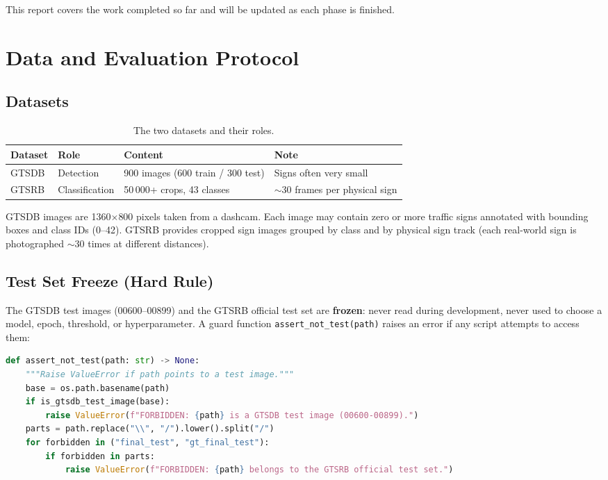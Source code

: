 \documentclass[12pt,a4paper]{article}
\begin{document}
This report covers the work completed so far and will be updated as each phase is finished.

\section{Data and Evaluation Protocol}
\label{sec:data}

\subsection{Datasets}

\begin{table}[H]
\centering
\renewcommand{\arraystretch}{1.3}
\begin{tabular}{llll}
\toprule
\textbf{Dataset} & \textbf{Role} & \textbf{Content} & \textbf{Note} \\
\midrule
GTSDB & Detection & 900 images (600 train / 300 test) & Signs often very small \\
GTSRB & Classification & 50\,000+ crops, 43 classes & $\sim$30 frames per physical sign \\
\bottomrule
\end{tabular}
\caption{The two datasets and their roles.}
\label{tab:datasets}
\end{table}

GTSDB images are 1360$\times$800 pixels taken from a dashcam. Each image may contain zero or more traffic signs annotated with bounding boxes and class IDs (0--42). GTSRB provides cropped sign images grouped by class and by physical sign track (each real-world sign is photographed $\sim$30 times at different distances).

\subsection{Test Set Freeze (Hard Rule)}

The GTSDB test images (00600--00899) and the GTSRB official test set are \textbf{frozen}: never read during development, never used to choose a model, epoch, threshold, or hyperparameter. A guard function \texttt{assert\_not\_test(path)} raises an error if any script attempts to access them:

\begin{lstlisting}[language=Python, caption={Test-set guard in \texttt{data.py}.}]
def assert_not_test(path: str) -> None:
    """Raise ValueError if path points to a test image."""
    base = os.path.basename(path)
    if is_gtsdb_test_image(base):
        raise ValueError(f"FORBIDDEN: {path} is a GTSDB test image (00600-00899).")
    parts = path.replace("\\", "/").lower().split("/")
    for forbidden in ("final_test", "gt_final_test"):
        if forbidden in parts:
            raise ValueError(f"FORBIDDEN: {path} belongs to the GTSRB official test set.")
\end{lstlisting}
\end{document}
